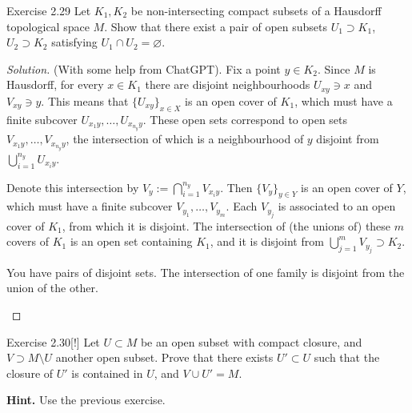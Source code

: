 \begin{thing4}{Exercise 2.29}\label{exer:2.29}\leavevmode
Let \(K_1, K_2\) be non-intersecting compact subsets of a Hausdorff topological space \(M\). Show that there exist a pair of open subsets \(U_1 \supset K_1\), \(U_2 \supset K_2\) satisfying \(U_1 \cap U_2=\varnothing\).
\end{thing4}

\begin{proof}[Solution]\leavevmode
	(With some help from {\color{6}ChatGPT}). Fix a point \(y \in K_2\). Since \(M\) is Hausdorff, for every \(x \in K_1\) there are disjoint neighbourhoods \(U_{xy} \ni x\) and \(V_{xy} \ni y\). This means that \( \{U_{xy}\}_{x \in X}\) is an open cover of \(K_1\), which must have a finite subcover \(U_{x_1y},\ldots,U_{x_{n_y}y}\). These open sets correspond to open sets \(V_{x_1y},\ldots,V_{x_{n_y}y}\), {\color{6}the intersection of which is a neighbourhood of $y$ disjoint from \(\bigcup_{i=1}^{n_{y}}U_{x_iy}\).}

Denote this intersection by \(V_y:=\bigcap_{i=1}^{n_{y}}V_{x_iy}\). Then \(\{V_y\}_{y \in Y}\) is an open cover of \(Y\), which must have a finite subcover \(V_{y_1},\ldots,V_{y_m}\). Each \(V_{y_j}\) is associated to an open cover of \(K_1\), from which it is disjoint. The intersection of (the unions of) these \(m\) covers of \(K_1\) is an open set containing \(K_1\), and it is disjoint from \(\bigcup_{j=1}^mV_{y_j} \supset K_2\).

\begin{upshot}\leavevmode
	You have pairs of disjoint sets. The intersection of one family is disjoint from the union of the other.
\end{upshot}
\end{proof}

\begin{thing4}{Exercise 2.30}[!]\label{exer:2.30}\leavevmode
Let \(U \subset M\) be an open subset with compact closure, and \(V \supset M\setminus U\) another open subset. Prove that there exists \(U' \subset U\) such that the closure of \(U'\) is contained in \(U\), and \(V \cup  U'=M\).

\textbf{Hint.} Use the previous exercise.
\end{thing4}

